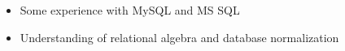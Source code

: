     {\begin{itemize}
        \item Some experience with MySQL and MS SQL
        \item Understanding of relational algebra and database normalization
    \end{itemize}}
    \vspace*{-\baselineskip}